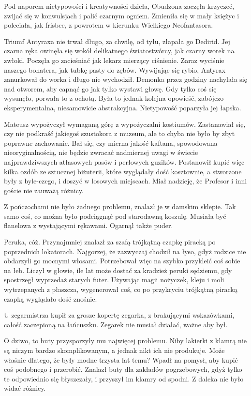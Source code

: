 \divider{}

Pod naporem nietypowości i kreatywności dzieła, Obudzona zaczęła krzyczeć, zwijać się w konwulsjach i palić czarnym ogniem.
Zmieniła się w mały księżyc i poleciała, jak frisbee, z powrotem w kierunku Wielkiego Neofantasora.

Triumf Antyraxa nie trwał długo, za chwilę, od tyłu, złapała go Dedirid.
Jej czarna ręka owinęła się wokół delikatnego światostwórcy, jak czarny worek na zwłoki.
Poczęła go zacieśniać jak lekarz mierzący ciśnienie.
Zaraz wyciśnie naszego bohatera, jak tubkę pasty do zębów.
Wywijając się rybio, Antyrax zanurkował do worka i długo nie wychodził.
Demonka przez godziny nachylała się nad otworem, aby capnąć go jak tylko wystawi głowę.
Gdy tylko coś się wysunęło, porwała to z ochotą.
Była to jednak kolejna opowieść, zabójczo eksperymentalna, niesamowicie abstrakcyjna.
Nietypowość poparzyła jej łapska.

\divider{}

Mateusz wypożyczył wymaganą górę z wypożyczalni kostiumów.
Zastanawiał się, czy nie podkraść jakiegoś szustokora z muzeum, ale to chyba nie było by zbyt poprawne zachowanie.
Bał się, czy mierna jakość kaftana, spowodowana nieoryginalnością, nie będzie zwracać nadmiernej uwagi w świecie najprawdziwszych atłasowych pasów i perłowych guzików.
Postanowił kupić więc kilka ozdób ze sztucznej biżuterii, które wyglądały dość kosztownie, a stworzone były z
byle-czego, i doszyć w losowych miejscach. Miał nadzieję, że Profesor i inni goście nie zauważą różnicy.

Z pończochami nie było żadnego problemu, znalazł je w damskim sklepie.
Tak samo coś, co można było podciągnąć pod starodawną koszulę.
Musiała być flanelowa z wystającymi rękawami.
Ogarnął także puder.

Peruka, cóż. Przynajmniej znalazł za szafą trójkątną czapkę piracką po poprzednich lokatorach.
Najgorzej, że zazwyczaj chodził na łyso, gdyż rodzice nie obdarzyli go mocnymi włosami.
Potrzebował więc na szybko przykleić coś sobie na łeb.
Liczył w głowie, ile lat może dostać za kradzież peruki sędziemu, gdy spostrzegł wyprzedaż starych futer.
Używając magii nożyczek, kleju i moli wytrzepanych z płaszcza, wygenerował coś, co po przykryciu trójkątną piracką czapką wyglądało dość znośnie.

U zegarmistrza kupił za grosze kopertę zegarka, z brakującymi wskazówkami, całość zaczepioną na łańcuszku.
Zegarek nie musiał działać, ważne aby był.

O dziwo, to buty przysporzyły mu najwięcej problemu.
Niby lakierki z klamrą nie są niczym bardzo skomplikowanym, a jednak nikt ich nie produkuje.
Może właśnie dlatego, że były modne trzysta lat temu?
Wpadł na pomysł, aby kupić coś podobnego i przerobić.
Znalazł buty dla zakładów pogrzebowych, gdyż tylko te odpowiednio się błyszczały, i przyszył im klamry od spodni.
Z daleka nie było widać różnicy.

